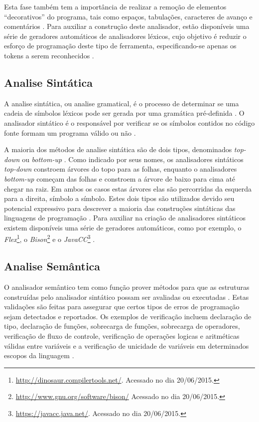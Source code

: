 Esta fase também tem a importância de realizar a remoção de elementos 
“decorativos” do programa, tais como espaços, tabulações, caracteres de 
avanço e comentários \cite[pág. 59]{ref15}. Para auxiliar a construção deste analisador,
 estão disponíveis uma série de geradores automáticos de analisadores léxicos, 
cujo objetivo é reduzir o esforço de programação deste tipo de ferramenta, 
especificando-se apenas os tokens a serem reconhecidos \cite[pág. 50]{ref18}.

\subsection{Analise Sintática}

A analise sintática, ou analise gramatical, é o processo de determinar 
se uma cadeia de símbolos léxicos pode ser gerada por uma gramática pré-definida
 \cite{ref19}. O analisador sintático é o responsável por verificar se os 
símbolos contidos no código fonte formam um programa válido ou não \cite[pág. 38]{ref20}.

A maioria dos métodos de analise sintática são de dois tipos, denominados 
\textit{top-down} ou \textit{bottom-up} \cite[pág.  227]{ref21}. Como indicado por 
seus nomes, os analisadores sintáticos \textit{top-down} constroem árvores 
do topo para as folhas, enquanto o analisadores \textit{bottom-up} começam das 
folhas e constroem a árvore de baixo para cima até chegar na raiz. Em ambos os
 casos  estas árvores  elas são percorridas da esquerda para a direita, 
símbolo a símbolo. Estes dois tipos são utilizados devido seu potencial 
expressivo para descrever a maioria das construções sintáticas das linguagens 
de programação \cite[pág. 38]{ref20}. Para auxiliar na criação de analisadores sintáticos 
existem disponíveis uma série de geradores automáticos, como por exemplo, 
o \textit{Flex}\footnote{\url{http://dinosaur.compilertools.net/}. Acessado no dia 20/06/2015.}, 
o \textit{Bison}\footnote{\url{http://www.gnu.org/software/bison/} Acessado no dia 20/06/2015.}
 e o \textit{JavaCC}\footnote{\url{https://javacc.java.net/}. Acessado no dia 20/06/2015.}
 \cite[pág. 30]{ref22}.

\subsection{Analise Semântica}

O analisador semântico tem como função prover métodos para que as estruturas 
construídas pelo analisador sintático possam ser avaliadas ou executadas \cite[pág. 337]{ref23}. 
Estas validações são feitas para assegurar que certos tipos de erros de 
programação sejam detectados e reportados. Os  exemplos de verificação incluem 
declaração de tipo, declaração de funções, sobrecarga de funções, sobrecarga de 
operadores, verificação de fluxo de controle, verificação de operações logicas e 
aritméticas válidas entre variáveis e a verificação de unicidade de variáveis em 
determinados escopos da linguagem \cite[pág. 147]{ref6}.


